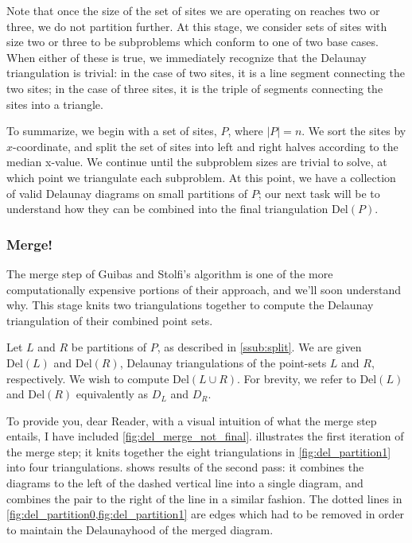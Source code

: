 \documentclass[12pt,twoside]{reedthesis}
\begin{document}
    Note that once the size of the set of sites we are operating on reaches two or three, we do not partition further. At this stage, we consider sets of sites with size two or three to be subproblems which conform to one of two base cases. When either of these is true, we immediately recognize that the Delaunay triangulation is trivial: in the case of two sites, it is a line segment connecting the two sites; in the case of three sites, it is the triple of segments connecting the sites into a triangle.\par

    To summarize, we begin with a set of sites, $P$, where $|P| = n$. We sort the sites by $x$-coordinate, and split the set of sites into left and right halves according to the median x-value. We continue until the subproblem sizes are trivial to solve, at which point we triangulate each subproblem. At this point, we have a collection of valid Delaunay diagrams on small partitions of $P$; our next task will be to understand how they can be combined into the final triangulation $\mbox{Del}(P)$.\par

  \subsubsection{Merge!}
  \label{ssub:merge}
    The merge step of Guibas and Stolfi's algorithm is one of the more computationally expensive portions of their approach, and we'll soon understand why. This stage knits two triangulations together to compute the Delaunay triangulation of their combined point sets. 

    Let $L$ and $R$ be partitions of $P$, as described in \cref{ssub:split}. We are given $\mbox{Del}(L)$ and $\mbox{Del}(R)$, Delaunay triangulations of the point-sets $L$ and $R$, respectively. We wish to compute $\mbox{Del}(L \cup R)$. For brevity, we refer to $\mbox{Del}(L)$ and $\mbox{Del}(R)$ equivalently as $D_{L}$ and $D_{R}$.\par

    To provide you, dear Reader, with a visual intuition of what the merge step entails, I have included \cref{fig:del_merge_not_final}.  illustrates the first iteration of the merge step; it knits together the eight triangulations in \cref{fig:del_partition1} into four triangulations.  shows results of the second pass: it combines the diagrams to the left of the dashed vertical line into a single diagram, and combines the pair to the right of the line in a similar fashion. The dotted lines in \cref{fig:del_partition0,fig:del_partition1} are edges which had to be removed in order to maintain the Delaunayhood of the merged diagram.\par
\end{document}
